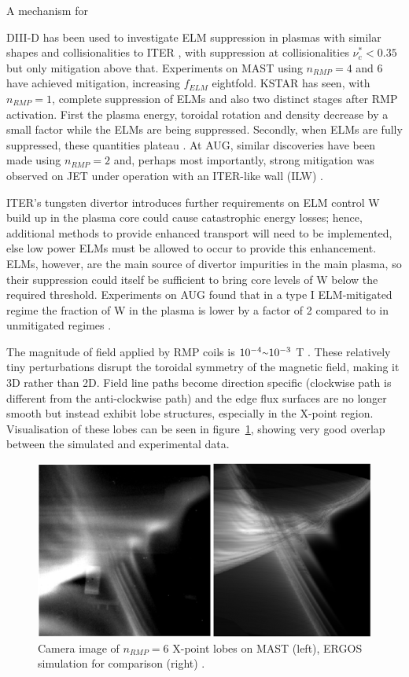 \documentclass[12pt]{article}  %
\providecommand{\squiggle}{\raise.17ex\hbox{$\scriptstyle\sim$}} %
\begin{document}
A mechanism for 

DIII-D has been used to investigate ELM suppression in plasmas with similar shapes and collisionalities to ITER \cite{Evans2008,Lanctot2013}, with suppression at collisionalities $\nu_c^* < 0.35$ but only mitigation above that. Experiments on MAST\cite{Kirk2013a} using $n_{RMP}=4 $ and $6$ have achieved mitigation, increasing $f_{ELM}$ eightfold. KSTAR has seen, with $n_{RMP}=1$, complete suppression of ELMs and also two distinct stages after RMP activation. First the plasma energy, toroidal rotation and density decrease by a small factor while the ELMs are being suppressed. Secondly, when ELMs are fully suppressed, these quantities plateau \cite{Kwak2013}. At AUG, similar discoveries have been made using $n_{RMP}=2$ \cite{Fischer2012,Suttrop2011} and, perhaps most importantly, strong mitigation was observed on JET under operation with an ITER-like wall (ILW) \cite{Liang2013}. 

ITER's tungsten divertor introduces further requirements on ELM control\cite{KirkFF} W build up in the plasma core could cause catastrophic energy losses; hence, additional methods to provide enhanced transport will need to be implemented, else low power ELMs must be allowed to occur to provide this enhancement. ELMs, however, are the main source of divertor impurities in the main plasma, so their suppression could itself be sufficient to bring core levels of W below the required threshold. Experiments on AUG found that in a type I ELM-mitigated regime the fraction of W in the plasma is lower by a factor of 2 compared to in unmitigated regimes \cite{Suttrop2011}.

The magnitude of field applied by RMP coils is $10^{-4} \squiggle 10^{-3}$ T \cite{Evans2015}. These relatively tiny perturbations disrupt the toroidal symmetry of the magnetic field, making it 3D rather than 2D. Field line paths become direction specific (clockwise path is different from the anti-clockwise path) and the edge flux surfaces are no longer smooth but instead exhibit lobe structures, especially in the X-point region. Visualisation of these lobes can be seen in figure~\ref{fig:lobes}, showing very good overlap between the simulated and experimental data.

\begin{figure}
\includegraphics[scale=0.5]{Figures/lobes.png}
\centering
\caption{Camera image of $n_{RMP}=6$ X-point lobes on MAST (left), ERGOS simulation for comparison (right) \cite{Harrison2014}.}\label{fig:lobes}
\end{figure}
\end{document}
